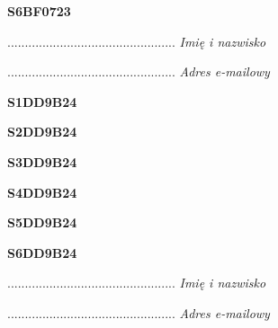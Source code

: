 \begin{turn}{90}\huge \textbf{S6BF0723}\end{turn}

\begin{turn}{90}\begin{minipage}{\linewidth} \vspace{20mm} ................................................  \textit{Imię i nazwisko}\end{minipage}\end{turn}

\begin{turn}{90}\begin{minipage}{\linewidth} \vspace{20mm} ................................................  \textit{Adres e-mailowy}\end{minipage}\end{turn}

\begin{turn}{90}\huge \textbf{S1DD9B24}\end{turn}

\begin{turn}{90}\huge \textbf{S2DD9B24}\end{turn}

\begin{turn}{90}\huge \textbf{S3DD9B24}\end{turn}

\begin{turn}{90}\huge \textbf{S4DD9B24}\end{turn}

\begin{turn}{90}\huge \textbf{S5DD9B24}\end{turn}

\begin{turn}{90}\huge \textbf{S6DD9B24}\end{turn}

\begin{turn}{90}\begin{minipage}{\linewidth} \vspace{20mm} ................................................  \textit{Imię i nazwisko}\end{minipage}\end{turn}

\begin{turn}{90}\begin{minipage}{\linewidth} \vspace{20mm} ................................................  \textit{Adres e-mailowy}\end{minipage}\end{turn}

